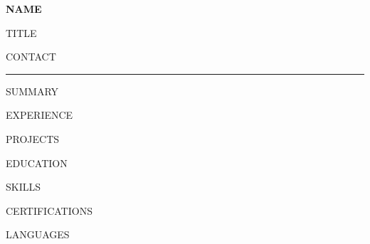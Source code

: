 \documentclass[10.5pt,a4paper]{article}
\begin{document}
\begin{center}
  {\LARGE\bfseries\color{ink} {{NAME}}}\par
  \vspace{0.1em}
  {\large\color{accent} {{TITLE}}}\par
  \vspace{0.12em}
  {\small\color{ink} {{CONTACT}}}
  \vspace{0.3em}
  {\color{accent}\rule{\textwidth}{1.2pt}}
\end{center}

{{SUMMARY}}

{{EXPERIENCE}}

{{PROJECTS}}

{{EDUCATION}}

{{SKILLS}}

{{CERTIFICATIONS}}

{{LANGUAGES}}
\end{document}
